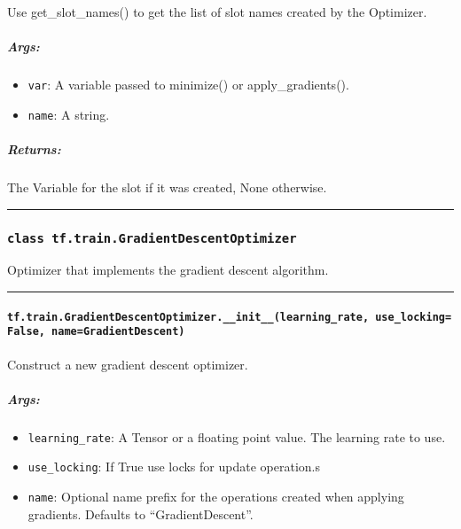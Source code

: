 Use get\_slot\_names() to get the list of slot names created by the
Optimizer.

\subparagraph{Args: }\label{args-4}

\begin{itemize}
\tightlist
\item
  \texttt{var}: A variable passed to minimize() or apply\_gradients().
\item
  \texttt{name}: A string.
\end{itemize}

\subparagraph{Returns: }\label{returns-4}

The Variable for the slot if it was created, None otherwise.

\begin{center}\rule{0.5\linewidth}{\linethickness}\end{center}

\subsubsection{\texorpdfstring{\texttt{class\ tf.train.GradientDescentOptimizer}
}{class tf.train.GradientDescentOptimizer }}\label{class-tf.train.gradientdescentoptimizer}

Optimizer that implements the gradient descent algorithm.

\begin{center}\rule{0.5\linewidth}{\linethickness}\end{center}

\paragraph{\texorpdfstring{\texttt{tf.train.GradientDescentOptimizer.\_\_init\_\_(learning\_rate,\ use\_locking=False,\ name=\textquotesingle{}GradientDescent\textquotesingle{})}
}{tf.train.GradientDescentOptimizer.\_\_init\_\_(learning\_rate, use\_locking=False, name='GradientDescent') }}\label{tf.train.gradientdescentoptimizer.ux5fux5finitux5fux5flearningux5frate-useux5flockingfalse-namegradientdescent}

Construct a new gradient descent optimizer.

\subparagraph{Args: }\label{args-5}

\begin{itemize}
\tightlist
\item
  \texttt{learning\_rate}: A Tensor or a floating point value. The
  learning rate to use.
\item
  \texttt{use\_locking}: If True use locks for update operation.s
\item
  \texttt{name}: Optional name prefix for the operations created when
  applying gradients. Defaults to ``GradientDescent''.
\end{itemize}

